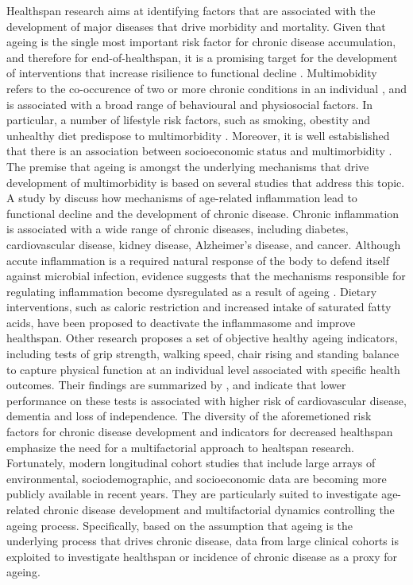 Healthspan research aims at identifying factors that are associated with the development of major diseases that drive morbidity and mortality. Given that ageing is the single most important risk factor for chronic disease accumulation, and therefore for end-of-healthspan, it is a promising target for the development of interventions that increase risilience to functional decline \citep{niccoli2012ageing}. Multimobidity refers to the co-occurence of two or more chronic conditions in an individual \citep{valderas2009defining}, and is associated with a broad range of behavioural and physiosocial factors. In particular, a number of lifestyle risk factors, such as smoking, obestity and unhealthy diet predispose to multimorbidity \citep{wikstrom2015clinical}. Moreover, it is well estabislished that there is an association between socioeconomic status and multimorbidity \citep{marmot2005social}. The premise that ageing is amongst the underlying mechanisms that drive development of multimorbidity is based on several studies that address this topic. A study by \cite{goldberg2015drivers} discuss how mechanisms of age-related inflammation lead to functional decline and the development of chronic disease. Chronic inflammation is associated with a wide range of chronic diseases, including diabetes, cardiovascular disease, kidney disease, Alzheimer's disease, and cancer. Although accute inflammation is a required natural response of the body to defend itself against microbial infection, evidence suggests that the mechanisms responsible for regulating inflammation become dysregulated as a result of ageing \citep{bruunsgaard2003age}. Dietary interventions, such as caloric restriction and increased intake of saturated fatty acids, have been proposed to deactivate the inflammasome and improve healthspan. Other research proposes a set of objective healthy ageing indicators, including tests of grip strength, walking speed, chair rising and standing balance to capture physical function at an individual level associated with specific health outcomes. Their findings are summarized by \cite{kuh2014life}, and indicate that lower performance on these tests is associated with higher risk of cardiovascular disease, dementia and loss of independence. The diversity of the aforemetioned risk factors for chronic disease development and indicators for decreased healthspan emphasize the need for a multifactorial approach to healtspan research. Fortunately, modern longitudinal cohort studies that include large arrays of environmental, sociodemographic, and socioeconomic data are becoming more publicly available in recent years. They are particularly suited to investigate age-related chronic disease development and multifactorial dynamics controlling the ageing process. Specifically, based on the assumption that ageing is the underlying process that drives chronic disease, data from large clinical cohorts is exploited to investigate healthspan or incidence of chronic disease as a proxy for ageing. 

